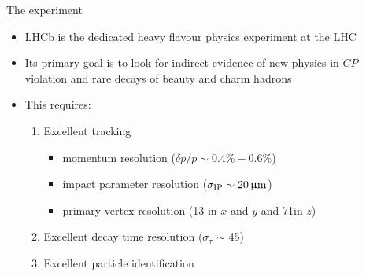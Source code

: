 \documentclass[aspectratio=1610]{beamer}
\begin{document}
\begin{frame}{The \lhcb experiment}
  \begin{itemize}
  \item LHCb is the dedicated heavy flavour physics experiment at the LHC
  \item Its primary goal is to look for indirect evidence of new physics in $CP$ violation and rare decays of beauty and charm hadrons
  \item This requires:
    \begin{enumerate}
    \item Excellent tracking 
      \begin{itemize}
      \item momentum resolution ($\delta p/p \sim 0.4\% - 0.6\%$)
      \item impact parameter resolution ($\sigma_{\rm IP} \sim 20{\,\upmu\mathrm{m}}$)
      \item primary vertex resolution (13 \mum in $x$ and $y$ and 71\mum in $z$)
      \end{itemize}
    \item Excellent decay time resolution ($\sigma_{\tau}$ $\sim$ 45\fs)
    \item Excellent particle identification
    \end{enumerate}
  \end{itemize}

  \bigskip
    

\end{frame}
\end{document}
